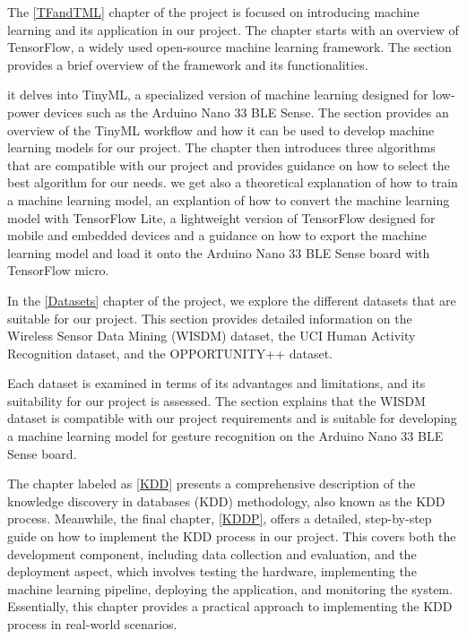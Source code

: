 The  \ref{TFandTML} chapter of the project is focused on introducing machine learning and its application in our project. The chapter starts with an overview of TensorFlow, a widely used open-source machine learning framework. The section provides a brief overview of the framework and its functionalities.

it delves into TinyML, a specialized version of machine learning designed for low-power devices such as the Arduino Nano 33 BLE Sense. The section provides an overview of the TinyML workflow and how it can be used to develop machine learning models for our project.
The chapter then introduces three algorithms that are compatible with our project and provides guidance on how to select the best algorithm for our needs. we get also a theoretical explanation of how to train a machine learning model, an explantion of  how to convert the machine learning model with TensorFlow Lite, a lightweight version of TensorFlow designed for mobile and embedded devices and a guidance on how to export the machine learning model and load it onto the Arduino Nano 33 BLE Sense board with TensorFlow micro.

In the \ref{Datasets} chapter of the project, we explore the different datasets that are suitable for our project. This section provides detailed information on the Wireless Sensor Data Mining (WISDM) dataset, the UCI Human Activity Recognition dataset, and the OPPORTUNITY++ dataset.

Each dataset is examined in terms of its advantages and limitations, and its suitability for our project is assessed. The section explains that the WISDM dataset is compatible with our project requirements and is suitable for developing a machine learning model for gesture recognition on the Arduino Nano 33 BLE Sense board. 

The chapter labeled as \ref{KDD} presents a comprehensive description of the knowledge discovery in databases (KDD) methodology, also known as the KDD process. Meanwhile, the final chapter, \ref{KDDP}, offers a detailed, step-by-step guide on how to implement the KDD process in our project. This covers both the development component, including data collection and evaluation, and the deployment aspect, which involves testing the hardware, implementing the machine learning pipeline, deploying the application, and monitoring the system. Essentially, this chapter provides a practical approach to implementing the KDD process in real-world scenarios.



